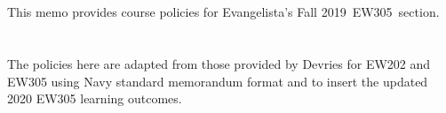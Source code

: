 \documentclass[11pt,courier]{navymemo}
\newcommand{\usnaCourseNumber}{EW305}
\newcommand{\usnaCourseTerm}{Fall 2019}
\begin{document}
%

\navyrecordnotesubjline

\section{}  This memo provides course policies for Evangelista's \usnaCourseTerm\ \usnaCourseNumber\ section.

\section{}  The policies here are adapted from those provided by Devries for EW202 and EW305 using Navy standard memorandum format and to insert the updated 2020 EW305 learning outcomes.

\end{document}
